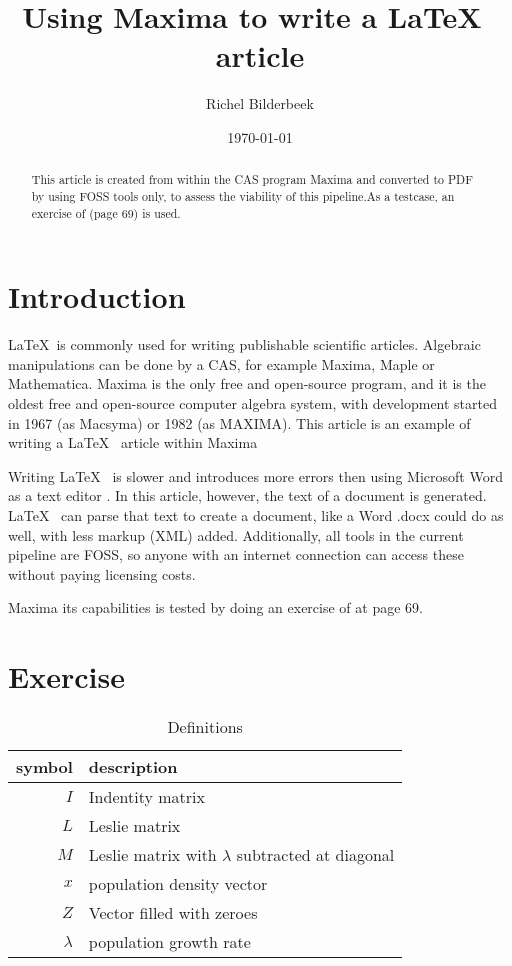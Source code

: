\documentclass{article}
\title{Using Maxima to write a \LaTeX~ article}
\author{Richel Bilderbeek}
\date{\today}
\begin{document}
\maketitle

\begin{abstract}
This article is created from within the CAS program Maxima
and converted to PDF by using FOSS tools only, to assess the viability of this pipeline.As a testcase, an exercise of \cite{case2000} (page 69) is used.
\end{abstract}

\section{Introduction}

\LaTeX~is commonly used for writing publishable scientific articles\cite{gaudeul2006}.
Algebraic manipulations can be done by a CAS, for example Maxima, Maple or Mathematica.
Maxima is the only free and open-source program, and it is the oldest free and open-source computer algebra system, with development started in 1967 (as Macsyma) or 1982 (as MAXIMA).
This article is an example of writing a \LaTeX~ article within Maxima

Writing \LaTeX~ is slower and introduces more errors 
then using Microsoft Word as a text editor \cite{knauff&nejasmic2014}.
In this article, however, the text of a document is generated. \LaTeX~ can
parse that text to create a document, like a Word .docx could do as well,
with less markup (XML) added. Additionally, all tools in the current pipeline
are FOSS, so anyone with an internet connection can access these without
paying licensing costs.

Maxima its capabilities is tested by doing an exercise of \cite{case2000} at page 69.

\section{Exercise}

\begin{table}[here]
  \centering
  \begin{tabular}{ | r | l | }
    \hline
    symbol & description \\
    \hline
    $I$ & Indentity matrix \\
    $L$ & Leslie matrix \\
    $M$ & Leslie matrix with $\lambda$ subtracted at diagonal \\
    $x$ & population density vector \\
    $Z$ & Vector filled with zeroes \\
    $\lambda$ & population growth rate \\
    \hline
  \end{tabular}
  \caption{Definitions}
  \label{table:table_definition}
\end{table}
\end{document}
